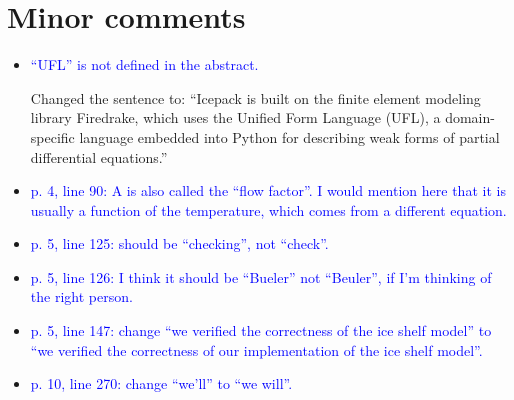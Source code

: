 \documentclass{article}
\theoremstyle{definition}
\theoremstyle{plain}
\begin{document}
\section*{Minor comments}

\begin{itemize}
\item \textcolor{blue}{``UFL'' is not defined in the abstract.}

Changed the sentence to: ``Icepack is built on the finite element modeling library Firedrake, which uses the Unified Form Language (UFL), a domain-specific language embedded into Python for describing weak forms of partial differential equations.''

\item \textcolor{blue}{p. 4, line 90: A is also called the ``flow factor''. I would mention here that it is usually a function of
the temperature, which comes from a different equation.}
\item \textcolor{blue}{p. 5, line 125: should be ``checking'', not ``check''.} \checkmark
\item \textcolor{blue}{p. 5, line 126: I think it should be ``Bueler'' not ``Beuler'', if I'm thinking of the right person.} \checkmark
\item \textcolor{blue}{p. 5, line 147: change ``we verified the correctness of the ice shelf model'' to ``we verified the correctness
of our implementation of the ice shelf model''.} \checkmark
\item \textcolor{blue}{p. 10, line 270: change ``we'll'' to ``we will''.} \checkmark
\end{itemize}
\end{document}
